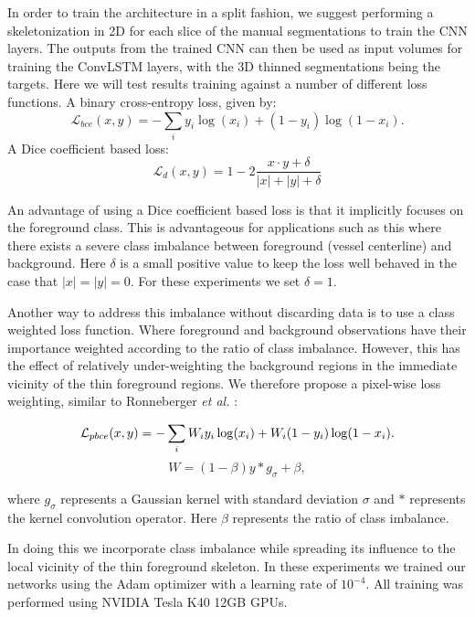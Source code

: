 \documentclass[journal,transmag]{IEEEtran}
\begin{document}
In order to train the architecture in a split fashion, we suggest performing a skeletonization in 2D for each slice of the manual segmentations to train the CNN layers. The outputs from the trained CNN can then be used as input volumes for training the ConvLSTM layers, with the 3D thinned segmentations being the targets. Here we will test results training against a number of different loss functions.
A binary cross-entropy loss, given by:
\begin{equation}
\mathcal{L}_{bce}(x,y) = -\sum_i{y_i \log(x_i) + (1-y_i) \log(1-x_i)}.
\label{eq:bce}
\end{equation}
A Dice coefficient based loss:
\begin{equation}
\mathcal{L}_{d}(x,y) = 1 - 2\frac{x \cdot y + \delta}{|x| + |y| + \delta}
\label{eq:dice}
\end{equation}

An advantage of using a Dice coefficient based loss is that it implicitly focuses on the foreground class. This is advantageous for applications such as this where there exists a severe class imbalance between foreground (vessel centerline) and background. Here $\delta$ is a small positive value to keep the loss well behaved in the case that $|x| = |y| = 0$. For these experiments we set $\delta = 1$.

Another way to address this imbalance without discarding data is to use a class weighted loss function. Where foreground and background observations have their importance weighted according to the ratio of class imbalance. However, this has the effect of relatively under-weighting the background regions in the immediate vicinity of the thin foreground regions. We therefore propose a pixel-wise loss weighting, similar to Ronneberger \emph{et al.} \cite{Ronneberger2015}:

\begin{equation}
\mathcal{L}_{pbce}(x,y) = -\sum_i{W_i y_i \log(x_i) + W_i (1-y_i) \log(1-x_i)}. \\
\label{eq:wbce}
\end{equation}
\begin{equation}
W = (1-\beta) y \ast g_\sigma + \beta,
\end{equation}

where $g_\sigma$ represents a Gaussian kernel with standard deviation $\sigma$ and $\ast$ represents the kernel convolution operator. Here $\beta$ represents the ratio of class imbalance. 

In doing this we incorporate class imbalance while spreading its influence to the local vicinity of the thin foreground skeleton. In these experiments we trained our networks using the Adam optimizer \cite{Kingma2014} with a learning rate of $10^{-4}$. All training was performed using NVIDIA Tesla K40 12GB GPUs.
\end{document}
